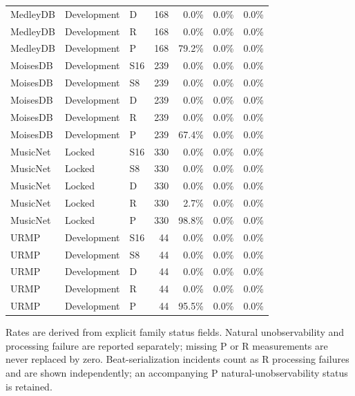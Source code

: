 \begin{longtable}{lllrrrr}
MedleyDB & Development & D & 168 & 0.0\% & 0.0\% & 0.0\% \\
MedleyDB & Development & R & 168 & 0.0\% & 0.0\% & 0.0\% \\
MedleyDB & Development & P & 168 & 79.2\% & 0.0\% & 0.0\% \\
MoisesDB & Development & S16 & 239 & 0.0\% & 0.0\% & 0.0\% \\
MoisesDB & Development & S8 & 239 & 0.0\% & 0.0\% & 0.0\% \\
MoisesDB & Development & D & 239 & 0.0\% & 0.0\% & 0.0\% \\
MoisesDB & Development & R & 239 & 0.0\% & 0.0\% & 0.0\% \\
MoisesDB & Development & P & 239 & 67.4\% & 0.0\% & 0.0\% \\
MusicNet & Locked & S16 & 330 & 0.0\% & 0.0\% & 0.0\% \\
MusicNet & Locked & S8 & 330 & 0.0\% & 0.0\% & 0.0\% \\
MusicNet & Locked & D & 330 & 0.0\% & 0.0\% & 0.0\% \\
MusicNet & Locked & R & 330 & 2.7\% & 0.0\% & 0.0\% \\
MusicNet & Locked & P & 330 & 98.8\% & 0.0\% & 0.0\% \\
URMP & Development & S16 & 44 & 0.0\% & 0.0\% & 0.0\% \\
URMP & Development & S8 & 44 & 0.0\% & 0.0\% & 0.0\% \\
URMP & Development & D & 44 & 0.0\% & 0.0\% & 0.0\% \\
URMP & Development & R & 44 & 0.0\% & 0.0\% & 0.0\% \\
URMP & Development & P & 44 & 95.5\% & 0.0\% & 0.0\% \\
\bottomrule
\end{longtable}
{\footnotesize Rates are derived from explicit family status fields. Natural unobservability and processing failure are reported separately; missing P or R measurements are never replaced by zero. Beat-serialization incidents count as R processing failures and are shown independently; an accompanying P natural-unobservability status is retained.}

